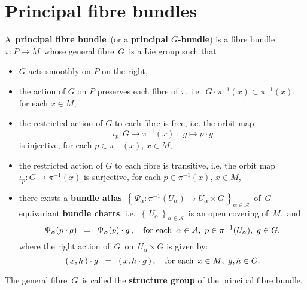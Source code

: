 

\section{Principal fibre bundles}
\setcounter{theorem}{0}
\setcounter{equation}{0}


\renewcommand{\theenumi}{\roman{enumi}}
\renewcommand{\labelenumi}{\textnormal{(\theenumi)}$\;\;$}


\begin{definition}
\mbox{}
\vskip 0.2cm
\noindent
A \,\textbf{principal fibre bundle}\, (or a \textbf{principal $G$-bundle})
is a fibre bundle \,$\pi : P \longrightarrow M$\,
whose general fibre \,$G$\, is a Lie group such that
\begin{itemize}
\item
	$G$ acts smoothly on $P$ {\color{red}on the right},
\item
	the action of $G$ on $P$ preserves each fibre of $\pi$, i.e. \,$G\cdot\pi^{-1}(x) \subset \pi^{-1}(x)$,\,
	for each $x \in M$,
\item
	the restricted action of $G$ to each fibre is free, i.e.
	the orbit map
	\begin{equation*}
	\iota_{p} : G \longrightarrow \pi^{-1}(x) \; : \; g \longmapsto p \cdot g
	\end{equation*}
	is injective,
	for each $p \in \pi^{-1}(x)$, $x \in M$,
\item
	the restricted action of $G$ to each fibre is transitive, i.e.
	the orbit map $\iota_{p} : G \longrightarrow \pi^{-1}(x)$ is surjective,
	for each $p \in \pi^{-1}(x)$, $x \in M$,
\item
	there exists a \textbf{bundle atlas}
	\,$\left\{\,\Psi_{\alpha} : \pi^{-1}(U_{\alpha}) \longrightarrow U_{\alpha} \times G\,\right\}_{\alpha\in\mathcal{A}}$\,
	of \,{\color{red}$G$-equivariant \textbf{bundle charts}}, i.e.
	\,$\left\{\,U_{\alpha}\,\right\}_{\alpha\in\mathcal{A}}$\,
	is an open covering of \,$M$,\, and
	\begin{equation*}
	\Psi_{\alpha}(p \cdot g) \;\; = \;\; \Psi_{\alpha}(p) \cdot g\,,
	\quad
	\textnormal{for each \,$\alpha \in \mathcal{A}$, \,$p \in \pi^{-1}(U_{\alpha})$, \,$g \in G$},
	\end{equation*}
	where the right action of \,$G$\, on \,$U_{\alpha} \times G$ is given by:
	\begin{equation*}
	(\,x,h\,) \cdot g \;\; = \;\; (\,x,h \cdot g\,)\,,
	\quad
	\textnormal{for each \,$x \in M$, \,$g,h \in G$}.
	\end{equation*}
\end{itemize}
The general fibre \,$G$\, is called the \textbf{structure group} of the principal fibre bundle.
\end{definition}

